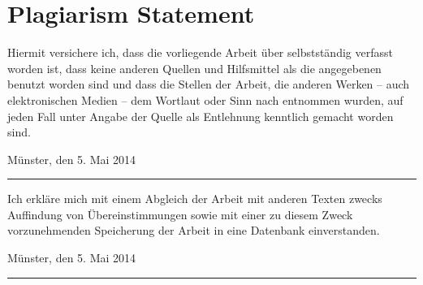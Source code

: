 \chapter*{Plagiarism Statement}
Hiermit versichere ich, dass die vorliegende Arbeit über \emph{\MyTitle} selbstständig verfasst worden ist, dass keine anderen Quellen und Hilfsmittel als die angegebenen benutzt worden sind und dass die Stellen der Arbeit, die anderen Werken – auch elektronischen Medien – dem Wortlaut oder Sinn nach entnommen wurden, auf jeden Fall unter Angabe der Quelle als Entlehnung kenntlich gemacht worden sind.

\vspace{.5cm}\hfill Münster, den 5. Mai 2014\hspace{.6cm}\rule{6cm}{.5pt}
\vspace{1cm}

Ich erkläre mich mit einem Abgleich der Arbeit mit anderen Texten zwecks Auffindung von Übereinstimmungen sowie mit einer zu diesem Zweck vorzunehmenden Speicherung der Arbeit in eine Datenbank einverstanden.

\vspace{.5cm}\hfill Münster, den 5. Mai 2014\hspace{.6cm}\rule{6cm}{.5pt}
